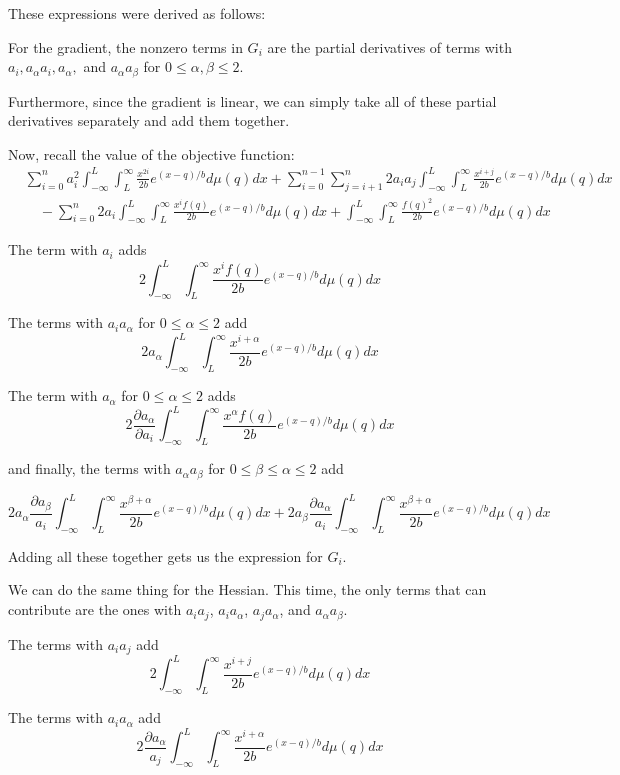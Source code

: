 \documentclass[11pt]{article}
\begin{document}
These expressions were derived as follows:

For the gradient, the nonzero terms in $G_i$ are the partial derivatives of terms with $a_i, a_{\alpha}a_i, a_\alpha,$ and $a_\alpha a_\beta$ for $0 \le \alpha,\beta \le 2$.

Furthermore, since the gradient is linear, we can simply take all of these partial derivatives separately and add them together.

Now, recall the value of the objective function:
\begin{align*}
&\sum_{i=0}^n a_i^2 \int_{-\infty}^L \int_L^\infty \frac{x^{2i}}{2b} e^{(x-q)/b} d\mu(q) dx + \sum_{i=0}^{n-1} \sum_{j=i+1}^n 2a_ia_j \int_{-\infty}^L \int_L^\infty \frac{x^{i+j}}{2b} e^{(x-q)/b} d\mu(q) dx \\
&\quad- \sum_{i=0}^n 2a_i \int_{-\infty}^L \int_L^\infty \frac{x^if(q)}{2b} e^{(x-q)/b} d\mu(q) dx + \int_{-\infty}^L \int_L^\infty \frac{f(q)^2}{2b}e^{(x-q)/b} d\mu(q)dx
\end{align*}

The term with $a_i$ adds
$$2\int_{-\infty}^L \int_L^\infty \frac{x^if(q)}{2b} e^{(x-q)/b} d\mu(q) dx$$

The terms with $a_i a_\alpha$ for $0 \le \alpha \le 2$ add
$$2 a_\alpha\int_{-\infty}^L \int_L^\infty \frac{x^{i+\alpha}}{2b} e^{(x-q)/b} d\mu(q) dx$$

The term with $a_\alpha$ for $0 \le \alpha \le 2$ adds
$$2\frac{\partial a_\alpha}{\partial a_i}\int_{-\infty}^L \int_L^\infty \frac{x^\alpha f(q)}{2b} e^{(x-q)/b} d\mu(q) dx$$

and finally, the terms with $a_\alpha a_\beta$ for $0\le \beta \le \alpha \le 2$ add

$$2 a_\alpha \frac{\partial a_\beta}{a_i}\int_{-\infty}^L \int_L^\infty \frac{x^{\beta+\alpha}}{2b} e^{(x-q)/b} d\mu(q) dx + 2 a_\beta \frac{\partial a_\alpha}{a_i}\int_{-\infty}^L \int_L^\infty \frac{x^{\beta+\alpha}}{2b} e^{(x-q)/b} d\mu(q) dx$$

Adding all these together gets us the expression for $G_i$.

We can do the same thing for the Hessian. This time, the only terms that can contribute are the ones with $a_ia_j$, $a_i a_\alpha$, $a_j a_\alpha$, and $a_\alpha a_\beta$.

The terms with $a_ia_j$ add
$$2 \int_{-\infty}^L \int_L^\infty \frac{x^{i+j}}{2b} e^{(x-q)/b} d\mu(q) dx$$

The terms with $a_i a_\alpha$ add
$$2 \frac{\partial a_\alpha}{a_j}\int_{-\infty}^L \int_L^\infty \frac{x^{i+\alpha}}{2b} e^{(x-q)/b} d\mu(q) dx$$
\end{document}

